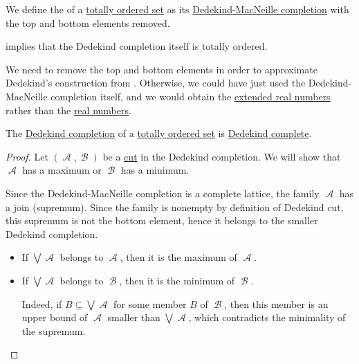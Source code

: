 \begin{definition}\label{def:dedekind_completion}\mimprovised
  We define the  of a \hyperref[def:totally_ordered_set]{totally ordered set} as its \hyperref[def:dedekind_macnielle_completion]{Dedekind-MacNeille completion} with the top and bottom elements removed.
\end{definition}
\begin{comments}
  \item {} implies that the Dedekind completion itself is totally ordered.
  \item We need to remove the top and bottom elements in order to approximate Dedekind's construction from \cite[sec. I.IV]{Beman1901Dedekind}. Otherwise, we could have just used the Dedekind-MacNeille completion itself, and we would obtain the \hyperref[def:extended_real_numbers]{extended real numbers} rather than the \hyperref[def:real_numbers]{real numbers}.
\end{comments}

\begin{theorem}\label{thm:def:dedekind_completion}
  The \hyperref[def:dedekind_completion]{Dedekind completion} of a \hyperref[def:totally_ordered_set]{totally ordered set} is \hyperref[def:dedekind_completeness]{Dedekind complete}.
\end{theorem}
\begin{proof}
  Let \( (\mscrA, \mscrB) \) be a \hyperref[def:dedekind_cut]{cut} in the Dedekind completion. We will show that \( \mscrA \) has a maximum or \( \mscrB \) has a minimum.

  Since the Dedekind-MacNeille completion is a complete lattice, the family \( \mscrA \) has a join (supremum). Since the family is nonempty by definition of Dedekind cut, this supremum is not the bottom element, hence it belongs to the smaller Dedekind completion.
  \begin{itemize}
    \item If \( \bigvee \mscrA \) belongs to \( \mscrA \), then it is the maximum of \( \mscrA \).
    \item If \( \bigvee \mscrA \) belongs to \( \mscrB \), then it is the minimum of \( \mscrB \).

    Indeed, if \( B \subseteq \bigvee \mscrA \) for some member \( B \) of \( \mscrB \), then this member is an upper bound of \( \mscrA \) smaller than \( \bigvee \mscrA \), which contradicts the minimality of the supremum. \qedhere
  \end{itemize}
\end{proof}

